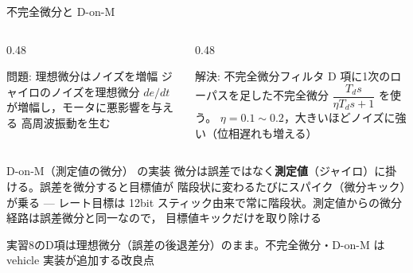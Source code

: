 \begin{frame}{不完全微分と D-on-M\later}
  \begin{columns}[T]
    \begin{column}{0.48\textwidth}
      \begin{alertblock}{問題: 理想微分はノイズを増幅}\footnotesize
        ジャイロのノイズを理想微分 $de/dt$ が増幅し，モータに悪影響を与える
        高周波振動を生む
      \end{alertblock}
    \end{column}
    \begin{column}{0.48\textwidth}
      \begin{exampleblock}{解決: 不完全微分フィルタ}\footnotesize
        D 項に1次のローパスを足した不完全微分 $\dfrac{T_d s}{\eta T_d s+1}$ を使う。
        $\eta=0.1\sim0.2$，大きいほどノイズに強い（位相遅れも増える）
      \end{exampleblock}
    \end{column}
  \end{columns}

  \begin{block}{D-on-M（測定値の微分） の実装}\footnotesize
    微分は誤差ではなく\textbf{測定値}（ジャイロ）に掛ける。誤差を微分すると目標値が
    階段状に変わるたびにスパイク（微分キック）が乗る --- レート目標は 12bit
    スティック由来で常に階段状。測定値からの微分経路は誤差微分と同一なので，
    目標値キックだけを取り除ける
  \end{block}

  {\footnotesize 実習8のD項は理想微分（誤差の後退差分）のまま。不完全微分・D-on-M
  は vehicle 実装が追加する改良点}
\end{frame}

